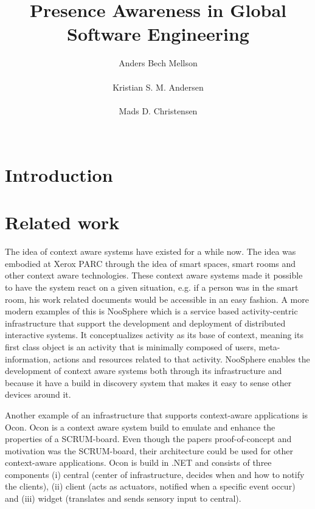 \documentclass{sigchi}
\begin{document}
\title{Presence Awareness in Global Software Engineering}

\author{
  \alignauthor Anders Bech Mellson\\
    \\
  \alignauthor Kristian S. M. Andersen\\
    \\
  \alignauthor Mads D. Christensen\\
    \\
}

\maketitle

\begin{abstract}

\end{abstract}



\section{Introduction}

\section{Related work}
The idea of context aware systems have existed for a while now. The idea was embodied at Xerox PARC through the idea of smart spaces, smart rooms and other context aware technologies. These context aware systems made it possible to have the system react on a given situation, e.g. if a person was in the smart room, his work related documents would be accessible in an easy fashion.
A more modern examples of this is NooSphere which is a service based activity-centric infrastructure that support the development and deployment of distributed interactive systems. It conceptualizes activity as its base of context, meaning its first class object is an activity that is minimally composed of users, meta-information, actions and resources related to that activity. NooSphere enables the development of context aware systems both through its infrastructure and because it have a build in discovery system that makes it easy to sense other devices around it.

Another example of an infrastructure that supports context-aware applications is Ocon. Ocon is a context aware system build to emulate and enhance the properties of a SCRUM-board. Even though the papers proof-of-concept and motivation was the SCRUM-board, their architecture could be used for other context-aware applications. Ocon is build in .NET and consists of three components (i) central (center of infrastructure, decides when and how to notify the clients), (ii) client (acts as actuators, notified when a specific event occur) and (iii) widget (translates and sends sensory input to central).
\end{document}
